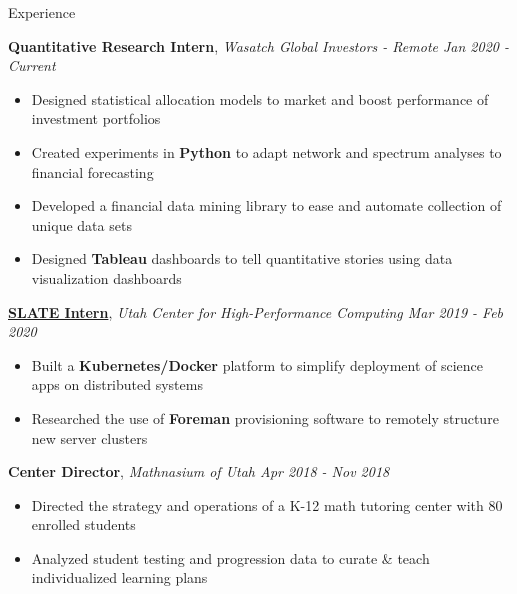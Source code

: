 \documentclass{resume}
\begin{document}
\begin{rSection}{Experience}

    {\bf Quantitative Research Intern}, {\em Wasatch Global Investors - Remote \hfill Jan 2020 - Current}
    \vspace{-6pt}
    \begin{itemize}[nosep]
        \item Designed statistical allocation models to market and boost performance of investment portfolios
        \item Created experiments in {\bf Python} to adapt network and spectrum analyses to financial forecasting
        \item Developed a financial data mining library to ease and automate collection of unique data sets
        \item Designed {\bf Tableau} dashboards to tell quantitative stories using data visualization dashboards
    \end{itemize}

    {\bf \href{https://slateci.io/}{SLATE Intern}}, {\em Utah Center for High-Performance Computing \hfill Mar 2019 - Feb 2020}
    \vspace{-6pt}
    \begin{itemize}[nosep]
        \item Built a {\bf Kubernetes/Docker} platform to simplify deployment of science apps on distributed systems
        \item Researched the use of {\bf Foreman} provisioning software to remotely structure new server clusters
    \end{itemize}
    
    {\bf Center Director}, {\em Mathnasium of Utah \hfill Apr 2018 - Nov 2018}
    \vspace{-6pt}
    \begin{itemize}[nosep]
        \item Directed the strategy and operations of a K-12 math tutoring center with 80 enrolled students
        \item Analyzed student testing and progression data to curate \& teach individualized learning plans
    \end{itemize}
    

\end{rSection}
\end{document}
